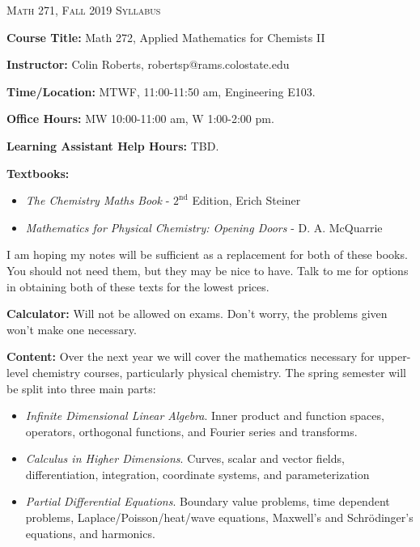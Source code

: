 \documentclass[12pt]{amsbook}
\begin{document}

\SetWatermarkText{
\begin{minipage}[c][8cm]{8cm}
\begin{center}
 
\end{center}
\end{minipage}
}



\begin{center}
   \textsc{\large Math 271, Fall 2019 Syllabus}
\end{center}
\vspace{.5cm}

\textbf{Course Title:} Math 272, Applied Mathematics for Chemists II

\textbf{Instructor:} Colin Roberts, robertsp@rams.colostate.edu

\textbf{Time/Location:} MTWF, 11:00-11:50 am, Engineering E103.  

\textbf{Office Hours:} MW 10:00-11:00 am, W 1:00-2:00 pm.

\textbf{Learning Assistant Help Hours:} TBD.

\textbf{Textbooks:} \begin{itemize}
    \item \emph{The Chemistry Maths Book} - $2^{\text{nd}}$ Edition, Erich Steiner
    \item \emph{Mathematics for Physical Chemistry: Opening Doors} - D. A. McQuarrie
\end{itemize}
I am hoping my notes will be sufficient as a replacement for both of these books.  You should not need them, but they may be nice to have.  Talk to me for options in obtaining both of these texts for the lowest prices.

\textbf{Calculator:} Will not be allowed on exams.  Don't worry, the problems given won't make one necessary.

\textbf{Content:} Over the next year we will cover the mathematics necessary for upper-level chemistry courses, particularly physical chemistry. The spring semester will be split into three main parts:
\begin{itemize}
    \item \emph{Infinite Dimensional Linear Algebra}. Inner product and function spaces, operators, orthogonal functions, and Fourier series and transforms.
    \item \emph{Calculus in Higher Dimensions}. Curves, scalar and vector fields, differentiation, integration, coordinate systems, and parameterization
    \item \emph{Partial Differential Equations}. Boundary value problems, time dependent problems, Laplace/Poisson/heat/wave equations, Maxwell's and Schr\"odinger's equations, and harmonics.
\end{itemize}
\end{document}
